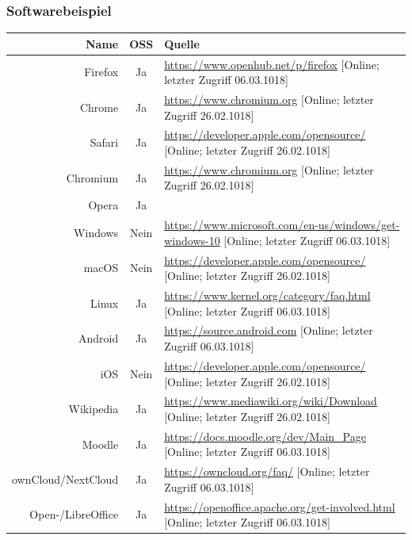 \documentclass[a4paper]{article}
\begin{document}
			 \subsubsection{Softwarebeispiel}
			     \begin{table}[!htbp]
			         \centering
			         \begin{tabularx}{\textwidth}{rcX}
			               Name & OSS & Quelle\\\hline\hline
			               Firefox & Ja & \tiny\url{https://www.openhub.net/p/firefox} [Online; letzter Zugriff 06.03.1018] \\
			               Chrome & Ja & \tiny\url{https://www.chromium.org} [Online; letzter Zugriff 26.02.1018] \\
			               Safari & Ja & \tiny\url{https://developer.apple.com/opensource/} [Online; letzter Zugriff 26.02.1018]\\
			               Chromium & Ja & \tiny\url{https://www.chromium.org} [Online; letzter Zugriff 26.02.1018] \\
			               Opera & Ja & \\\hline
			               Windows & Nein & \tiny\url{https://www.microsoft.com/en-us/windows/get-windows-10} [Online; letzter Zugriff 06.03.1018]\\
			               macOS & Nein & \tiny\url{https://developer.apple.com/opensource/} [Online; letzter Zugriff 26.02.1018] \\
			               Linux & Ja & \tiny\url{https://www.kernel.org/category/faq.html} [Online; letzter Zugriff 06.03.1018] \\
			               Android & Ja & \tiny\url{https://source.android.com} [Online; letzter Zugriff 06.03.1018] \\
			               iOS & Nein & \tiny\url{https://developer.apple.com/opensource/} [Online; letzter Zugriff 26.02.1018] \\\hline
			               Wikipedia & Ja & \tiny\url{https://www.mediawiki.org/wiki/Download} [Online; letzter Zugriff 26.02.1018]\\
			               Moodle & Ja & \tiny\url{https://docs.moodle.org/dev/Main_Page} [Online; letzter Zugriff 06.03.1018] \\
			               ownCloud/NextCloud & Ja & \tiny\url{https://owncloud.org/faq/} [Online; letzter Zugriff 06.03.1018] \\\hline
			               Open-/LibreOffice & Ja & \tiny\url{https://openoffice.apache.org/get-involved.html} [Online; letzter Zugriff 06.03.1018] \\

\end{tabularx}
\end{table}
\end{document}
